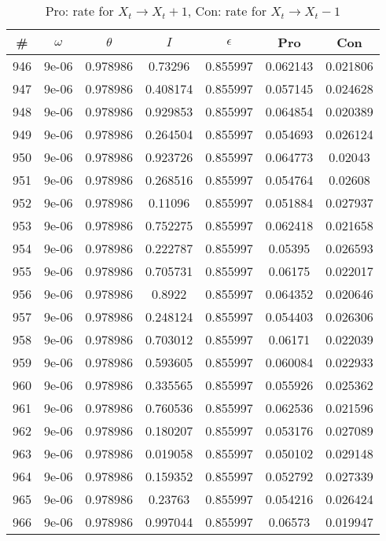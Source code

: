 \newpage
\begin{table}
\caption{Pro: rate for $X_t \rightarrow X_t + 1$, Con: rate for $X_t \rightarrow X_t - 1$}
\begin{tabular*}{\linewidth}{c|c|c|c|c|c|c}
\# & $\omega$ & $\theta$ & $I$ & $\epsilon$ & Pro & Con \\
\hline
946 & 9e-06 & 0.978986 & 0.73296 & 0.855997 & 0.062143 & 0.021806\\
947 & 9e-06 & 0.978986 & 0.408174 & 0.855997 & 0.057145 & 0.024628\\
948 & 9e-06 & 0.978986 & 0.929853 & 0.855997 & 0.064854 & 0.020389\\
949 & 9e-06 & 0.978986 & 0.264504 & 0.855997 & 0.054693 & 0.026124\\
950 & 9e-06 & 0.978986 & 0.923726 & 0.855997 & 0.064773 & 0.02043\\
951 & 9e-06 & 0.978986 & 0.268516 & 0.855997 & 0.054764 & 0.02608\\
952 & 9e-06 & 0.978986 & 0.11096 & 0.855997 & 0.051884 & 0.027937\\
953 & 9e-06 & 0.978986 & 0.752275 & 0.855997 & 0.062418 & 0.021658\\
954 & 9e-06 & 0.978986 & 0.222787 & 0.855997 & 0.05395 & 0.026593\\
955 & 9e-06 & 0.978986 & 0.705731 & 0.855997 & 0.06175 & 0.022017\\
956 & 9e-06 & 0.978986 & 0.8922 & 0.855997 & 0.064352 & 0.020646\\
957 & 9e-06 & 0.978986 & 0.248124 & 0.855997 & 0.054403 & 0.026306\\
958 & 9e-06 & 0.978986 & 0.703012 & 0.855997 & 0.06171 & 0.022039\\
959 & 9e-06 & 0.978986 & 0.593605 & 0.855997 & 0.060084 & 0.022933\\
960 & 9e-06 & 0.978986 & 0.335565 & 0.855997 & 0.055926 & 0.025362\\
961 & 9e-06 & 0.978986 & 0.760536 & 0.855997 & 0.062536 & 0.021596\\
962 & 9e-06 & 0.978986 & 0.180207 & 0.855997 & 0.053176 & 0.027089\\
963 & 9e-06 & 0.978986 & 0.019058 & 0.855997 & 0.050102 & 0.029148\\
964 & 9e-06 & 0.978986 & 0.159352 & 0.855997 & 0.052792 & 0.027339\\
965 & 9e-06 & 0.978986 & 0.23763 & 0.855997 & 0.054216 & 0.026424\\
966 & 9e-06 & 0.978986 & 0.997044 & 0.855997 & 0.06573 & 0.019947\\

\end{tabular*}
\end{table}
